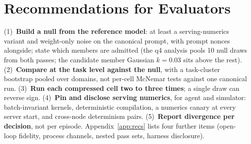\section{Recommendations for Evaluators}
\label{sec:recs}

(1)~\textbf{Build a null from the reference model}: at least a serving-numerics variant and weight-only noise on the canonical prompt, with prompt nonces alongside; state which members are admitted (the q4 analysis pools 10 null draws from both passes; the candidate member Gaussian $k{=}0.03$ sits above the rest).
(2)~\textbf{Compare at the task level against the null}, with a task-cluster bootstrap pooled over domains, not per-cell McNemar tests against one canonical run.
(3)~\textbf{Run each compressed cell two to three times}; a single draw can reverse sign.
(4)~\textbf{Pin and disclose serving numerics}, for agent and simulator: batch-invariant kernels, deterministic compilation, a numerics canary at every server start, and cross-node determinism pairs.
(5)~\textbf{Report divergence per decision}, not per episode.
Appendix~\ref{app:recs} lists four further items (open-loop fidelity, process channels, nested pass sets, harness disclosure).
